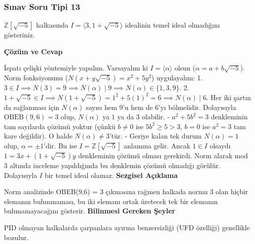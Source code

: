 \documentclass[11pt, a4paper]{article}
\newenvironment{cozum}{
    \vspace{0.5cm}
    \noindent\textcolor{green!60!black}{\faCheckCircle\enspace \textbf{\Large Çözüm ve Cevap}}\par\vspace{0.2cm}
}{}
\newenvironment{sezgisel}{
    \vspace{0.5cm}
    \noindent\textcolor{orange!80!black}{\faLightbulb\enspace \textbf{\Large Sezgisel Açıklama}}\par\vspace{0.2cm}
    \itshape
}{}
\newenvironment{bilgi}{
    \vspace{0.5cm}
    \noindent\textcolor{red!70!black}{\faExclamationTriangle\enspace \textbf{\Large Bilinmesi Gereken Şeyler}}\par\vspace{0.2cm}
}{}
\begin{document}
\newpage
\subsubsection{Sınav Soru Tipi 13}
\begin{sinavbox}
$\mathbb{Z}[\sqrt{-5}]$ halkasında $I = \langle 3, 1+\sqrt{-5} \rangle$ idealinin temel ideal olmadığını gösteriniz.
\end{sinavbox}
\begin{cozum}
İspatı çelişki yöntemiyle yapalım. Varsayalım ki $I = \langle \alpha \rangle$ olsun ($\alpha = a+b\sqrt{-5}$).
Norm fonksiyonunu ($N(x+y\sqrt{-5}) = x^2+5y^2$) uygulayalım:
1. $3 \in I \implies N(3) = 9 \implies N(\alpha) \mid 9 \implies N(\alpha) \in \{1, 3, 9\}$.
2. $1+\sqrt{-5} \in I \implies N(1+\sqrt{-5}) = 1^2+5(1)^2 = 6 \implies N(\alpha) \mid 6$.
Her iki şartın da sağlanması için $N(\alpha)$ sayısı hem 9'u hem de 6'yı bölmelidir. Dolayısıyla $\text{OBEB}(9, 6) = 3$ olup, $N(\alpha)$ ya $1$ ya da $3$ olabilir.
- $a^2+5b^2 = 3$ denkleminin tam sayılarda çözümü yoktur (çünkü $b \neq 0$ ise $5b^2 \ge 5 > 3$, $b=0$ ise $a^2=3$ tam kare değildir). O halde $N(\alpha) \neq 3$'tür.
- Geriye kalan tek durum $N(\alpha) = 1$ olup, $\alpha = \pm 1$'dir. Bu ise $I = \mathbb{Z}[\sqrt{-5}]$ anlamına gelir. Ancak $1 \in I$ olsaydı $1 = 3x + (1+\sqrt{-5})y$ denkleminin çözümü olması gerekirdi. Norm alarak mod 3 altında inceleme yapıldığında bu denklemin çözümü olmadığı görülür.
Dolayısıyla $I$ bir temel ideal olamaz.
\end{cozum}
\begin{sezgisel}
Norm analizinde OBEB(9,6) = 3 çıkmasına rağmen halkada normu 3 olan hiçbir elemanın bulunmaması, bu iki elemanı ortak üretecek tek bir elemanın bulunamayacağını gösterir.
\end{sezgisel}
\begin{bilgi}
PID olmayan halkalarda çarpanlara ayırma benzersizliği (UFD özelliği) genellikle bozulur.
\end{bilgi}

\newpage
\end{document}
